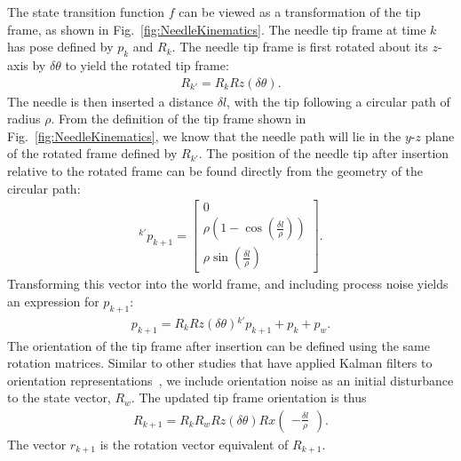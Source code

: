 The state transition function $f$ can be viewed as a transformation of the tip frame, as shown in Fig.~\ref{fig:NeedleKinematics}. The needle tip frame at time ${k}$ has pose defined by ${p_{k}}$ and ${R_{k}}$. The needle tip frame is first rotated about its $z$-axis by $\delta\theta$ to yield the rotated tip frame:
\begin{align}
{R_{k'}} = {R_{k}}{Rz}(\delta\theta).
\end{align}
The needle is then inserted a distance $\delta l$, with the tip following a circular path of radius $\rho$. From the definition of the tip frame shown in Fig.~\ref{fig:NeedleKinematics}, we know that the needle path will lie in the $y$-$z$ plane of the rotated frame defined by ${R_{k'}}$. The position of the needle tip after insertion relative to the rotated frame can be found directly from the geometry of the circular path:
\begin{align}
{^{k'}p_{k+1}} = \begin{bmatrix}0\\ \rho(1-\cos(\frac{\delta l}{\rho})) \\ \rho\sin(\frac{\delta l}{\rho})\end{bmatrix}.
\end{align}
Transforming this vector into the world frame, and including process noise yields an expression for $p_{k+1}$:
\begin{align}
{p_{k+1}} = {R_{k}}{Rz}(\delta\theta){^{k'}p_{k+1}}+{p_k} +{p_w}.
\end{align}
The orientation of the tip frame after insertion can be defined using the same rotation matrices. Similar to other studies that have applied Kalman filters to orientation representations~\cite{Kraft2003}, we include orientation noise as an initial disturbance to the state vector, ${R_w}$.
The updated tip frame orientation is thus
\begin{align}
{R_{k+1}} = {R_{k}}{R_w}{Rz}(\delta\theta){Rx}\left(\begin{matrix}-\frac{\delta l}{\rho}\end{matrix}\right).
\end{align}
The vector ${r_{k+1}}$ is the rotation vector equivalent of ${R_{k+1}}$.

